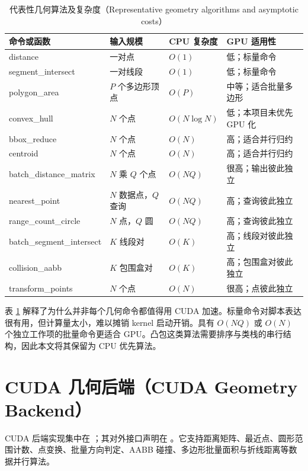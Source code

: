 \begin{table}[H]
\centering
\caption{代表性几何算法及复杂度（Representative geometry algorithms and asymptotic costs）}
\label{tab:algorithm-complexity}
\footnotesize
\setlength{\tabcolsep}{3.5pt}
\begin{tabularx}{\textwidth}{@{}>{\ttfamily\raggedright\arraybackslash}p{} >{\raggedright\arraybackslash}X >{\centering\arraybackslash}p{} >{\raggedright\arraybackslash}X@{}}
\toprule
命令或函数 & 输入规模 & CPU 复杂度 & GPU 适用性 \\
\midrule
distance & 一对点 & \(O(1)\) & 低；标量命令 \\
segment\_intersect & 一对线段 & \(O(1)\) & 低；标量命令 \\
polygon\_area & \(P\) 个多边形顶点 & \(O(P)\) & 中等；适合批量多边形 \\
convex\_hull & \(N\) 个点 & \(O(N\log N)\) & 低；本项目未优先 GPU 化 \\
bbox\_reduce & \(N\) 个点 & \(O(N)\) & 高；适合并行归约 \\
centroid & \(N\) 个点 & \(O(N)\) & 高；适合并行归约 \\
batch\_distance\_matrix & \(N\) 乘 \(Q\) 个点 & \(O(NQ)\) & 很高；输出彼此独立 \\
nearest\_point & \(N\) 数据点，\(Q\) 查询 & \(O(NQ)\) & 高；查询彼此独立 \\
range\_count\_circle & \(N\) 点，\(Q\) 圆 & \(O(NQ)\) & 高；查询彼此独立 \\
batch\_segment\_intersect & \(K\) 线段对 & \(O(K)\) & 高；线段对彼此独立 \\
collision\_aabb & \(K\) 包围盒对 & \(O(K)\) & 高；包围盒对彼此独立 \\
transform\_points & \(N\) 个点 & \(O(N)\) & 很高；点彼此独立 \\
\bottomrule
\end{tabularx}
\end{table}

表 \ref{tab:algorithm-complexity} 解释了为什么并非每个几何命令都值得用 CUDA 加速。标量命令对脚本表达很有用，但计算量太小，难以摊销 kernel 启动开销。具有 \(O(NQ)\) 或 \(O(N)\) 个独立工作项的批量命令更适合 GPU。凸包这类算法需要排序与类栈的串行结构，因此本文将其保留为 CPU 优先算法。

\section{CUDA 几何后端（CUDA Geometry Backend）}
CUDA 后端实现集中在 ；其对外接口声明在 。它支持距离矩阵、最近点、圆形范围计数、点变换、批量方向判定、AABB 碰撞、多边形批量面积与折线距离等数据并行算法。

